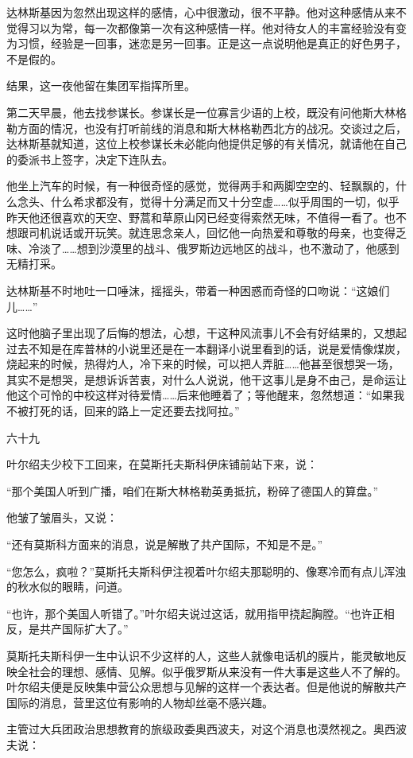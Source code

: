 达林斯基因为忽然出现这样的感情，心中很激动，很不平静。他对这种感情从来不觉得习以为常，每一次都像第一次有这种感情一样。他对待女人的丰富经验没有变为习惯，经验是一回事，迷恋是另一回事。正是这一点说明他是真正的好色男子，不是假的。

结果，这一夜他留在集团军指挥所里。

第二天早晨，他去找参谋长。参谋长是一位寡言少语的上校，既没有问他斯大林格勒方面的情况，也没有打听前线的消息和斯大林格勒西北方的战况。交谈过之后，达林斯基就知道，这位上校参谋长未必能向他提供足够的有关情况，就请他在自己的委派书上签字，决定下连队去。

他坐上汽车的时候，有一种很奇怪的感觉，觉得两手和两脚空空的、轻飘飘的，什么念头、什么希求都没有，觉得十分满足而又十分空虚……似乎周围的一切，似乎昨天他还很喜欢的天空、野蒿和草原山冈已经变得索然无味，不值得一看了。也不想跟司机说话或开玩笑。就连思念亲人，回忆他一向热爱和尊敬的母亲，也变得乏味、冷淡了……想到沙漠里的战斗、俄罗斯边远地区的战斗，也不激动了，他感到无精打采。

达林斯基不时地吐一口唾沫，摇摇头，带着一种困惑而奇怪的口吻说：“这娘们儿……”

这时他脑子里出现了后悔的想法，心想，干这种风流事儿不会有好结果的，又想起过去不知是在库普林的小说里还是在一本翻译小说里看到的话，说是爱情像煤炭，烧起来的时候，热得灼人，冷下来的时候，可以把人弄脏……他甚至很想哭一场，其实不是想哭，是想诉诉苦衷，对什么人说说，他干这事儿是身不由己，是命运让他这个可怜的中校这样对待爱情……后来他睡着了；等他醒来，忽然想道：“如果我不被打死的话，回来的路上一定还要去找阿拉。”

六十九

叶尔绍夫少校下工回来，在莫斯托夫斯科伊床铺前站下来，说：

“那个美国人听到广播，咱们在斯大林格勒英勇抵抗，粉碎了德国人的算盘。”

他皱了皱眉头，又说：

“还有莫斯科方面来的消息，说是解散了共产国际，不知是不是。”

“您怎么，疯啦？”莫斯托夫斯科伊注视着叶尔绍夫那聪明的、像寒冷而有点儿浑浊的秋水似的眼睛，问道。

“也许，那个美国人听错了。”叶尔绍夫说过这话，就用指甲挠起胸膛。“也许正相反，是共产国际扩大了。”

莫斯托夫斯科伊一生中认识不少这样的人，这些人就像电话机的膜片，能灵敏地反映全社会的理想、感情、见解。似乎俄罗斯从来没有一件大事是这些人不了解的。叶尔绍夫便是反映集中营公众思想与见解的这样一个表达者。但是他说的解散共产国际的消息，营里这位有影响的人物却丝毫不感兴趣。

主管过大兵团政治思想教育的旅级政委奥西波夫，对这个消息也漠然视之。奥西波夫说：

